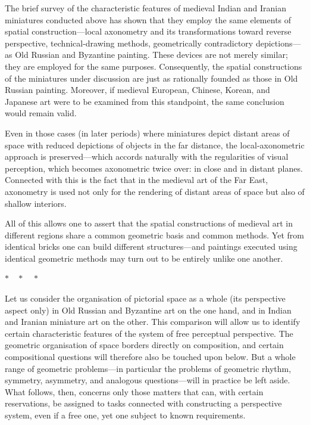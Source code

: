 The brief survey of the characteristic features of medieval Indian and Iranian
miniatures conducted above has shown that they employ the same elements of spatial
construction---local axonometry and its transformations toward reverse perspective,
technical-drawing methods, geometrically contradictory depictions---as Old Russian
and Byzantine painting. These devices are not merely similar; they are employed for
the same purposes. Consequently, the spatial constructions of the miniatures under
discussion are just as rationally founded as those in Old Russian painting. Moreover,
if medieval European, Chinese, Korean, and Japanese art were to be examined from
this standpoint, the same conclusion would remain valid.

Even in those cases (in later periods) where miniatures depict distant areas of
space with reduced depictions of objects in the far distance, the local-axonometric
approach is preserved---which accords naturally with the regularities of visual
perception, which becomes axonometric twice over: in close and in distant planes.
Connected with this is the fact that in the medieval art of the Far East, axonometry
is used not only for the rendering of distant areas of space but also of shallow
interiors.

All of this allows one to assert that the spatial constructions of medieval art in
different regions share a common geometric basis and common methods. Yet from
identical bricks one can build different structures---and paintings executed using
identical geometric methods may turn out to be entirely unlike one another.


\begin{center}$*\quad*\quad*$\end{center}

\noindent Let us consider the organisation of pictorial space as a whole (its
perspective aspect only) in Old Russian and Byzantine art on the one hand, and in
Indian and Iranian miniature art on the other. This comparison will allow us to
identify certain characteristic features of the system of free perceptual
perspective. The geometric organisation of space borders directly on composition,
and certain compositional questions will therefore also be touched upon below. But
a whole range of geometric problems---in particular the problems of geometric
rhythm, symmetry, asymmetry, and analogous questions---will in practice be left
aside. What follows, then, concerns only those matters that can, with certain
reservations, be assigned to tasks connected with constructing a perspective system,
even if a free one, yet one subject to known requirements.

